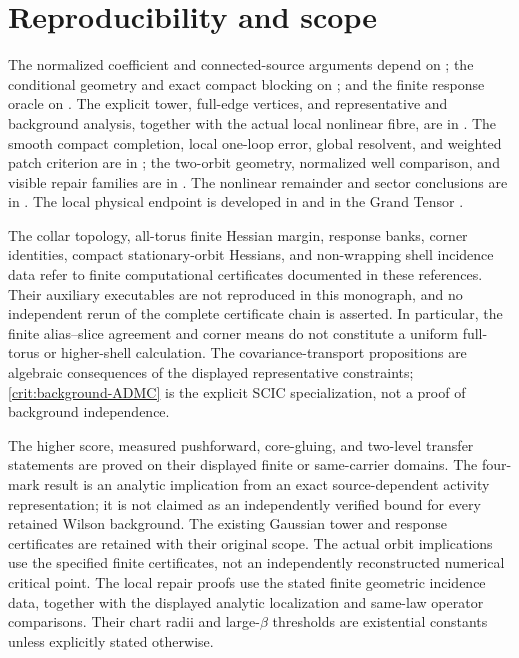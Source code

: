 \documentclass[11pt,oneside,openany]{book}
\theoremstyle{definition}
\theoremstyle{remark}
\begin{document}
\section{Reproducibility and scope}
The normalized coefficient and connected-source arguments depend on
\cite{F1,F2,F3,F4,F5,F6}; the conditional geometry and exact compact
blocking on \cite{F6,F7,F8,F9}; and the finite response oracle on
\cite{F9,F10}. The explicit tower, full-edge vertices, and representative
and background analysis, together with the actual local nonlinear
fibre, are in \cite{F11}. The smooth compact completion, local one-loop
error, global resolvent, and weighted patch criterion are in \cite{F12};
the two-orbit geometry, normalized well comparison, and visible repair
families are in \cite{F13}. The nonlinear remainder and
sector conclusions are in \cite{PAR}. The local physical endpoint is
developed in \cite{F1} and in the Grand Tensor \cite{GT}.

The collar topology, all-torus finite Hessian margin, response banks,
corner identities, compact stationary-orbit Hessians, and non-wrapping
shell incidence data refer to finite computational certificates documented
in these references. Their auxiliary executables are not reproduced in
this monograph, and no independent rerun of the complete certificate
chain is asserted. In particular, the finite alias--slice agreement and
corner means do not constitute a uniform full-torus or higher-shell
calculation. The covariance-transport propositions are algebraic
consequences of the displayed representative constraints;
\cref{crit:background-ADMC} is the explicit SCIC specialization, not a
proof of background independence.

The higher score, measured pushforward, core-gluing, and two-level
transfer statements are proved on their displayed finite or
same-carrier domains. The four-mark result is an analytic implication
from an exact source-dependent activity representation; it is not
claimed as an independently verified bound for every retained Wilson
background. The existing Gaussian tower and response certificates are
retained with their original scope. The actual orbit implications use
the specified finite certificates, not an independently reconstructed
numerical critical point. The local repair proofs use the stated
finite geometric incidence data, together with the displayed analytic
localization and same-law operator comparisons. Their chart radii and
large-$\beta$ thresholds are existential constants unless explicitly
stated otherwise.
\end{document}
